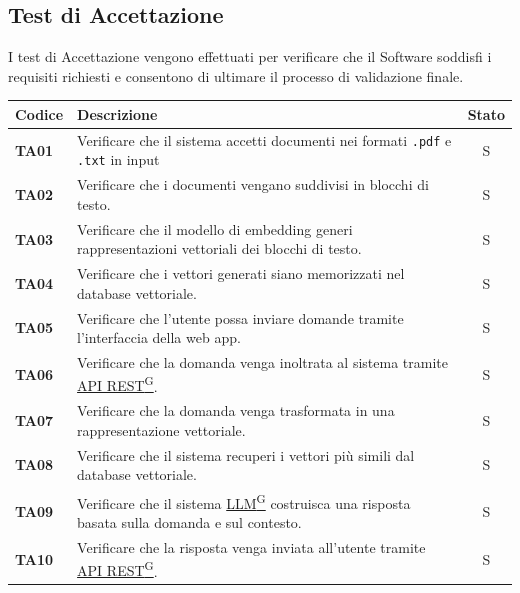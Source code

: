 \documentclass{article}
\begin{document}
\newpage
\subsection{Test di Accettazione} %
I test di Accettazione vengono effettuati per verificare che il Software soddisfi i requisiti richiesti e consentono di ultimare il processo di validazione finale.

\begin{longtable}{|>{\centering\arraybackslash}m{}|>{\raggedright\arraybackslash}m{}|c|}
    \hline
    \textbf{Codice} & \textbf{Descrizione} & \textbf{Stato} \\
    \hline
    \textbf{TA01} & Verificare che il sistema accetti documenti nei formati \texttt{.pdf} e \texttt{.txt} in input & S \\
    \hline
    \textbf{TA02} & Verificare che i documenti vengano suddivisi in blocchi di testo. & S \\
    \hline
    \textbf{TA03} & Verificare che il modello di embedding generi rappresentazioni vettoriali dei blocchi di testo. & S \\
    \hline
    \textbf{TA04} & Verificare che i vettori generati siano memorizzati nel database vettoriale. & S\\
    \hline
    \textbf{TA05} & Verificare che l’utente possa inviare domande tramite l’interfaccia della web app.& S\\
    \hline
    \textbf{TA06} & Verificare che la domanda venga inoltrata al sistema tramite \href{https://code7crusaders.github.io/docs/PB/documentazione_interna/glossario.html#api-rest-representational-state-transfer}{API REST\textsuperscript{G}}. & S\\
    \hline
    \textbf{TA07} & Verificare che la domanda venga trasformata in una rappresentazione vettoriale. & S\\
    \hline
    \textbf{TA08} & Verificare che il sistema recuperi i vettori più simili dal database vettoriale. & S\\
    \hline
    \textbf{TA09} & Verificare che il sistema \href{https://code7crusaders.github.io/docs/PB/documentazione_interna/glossario.html#llm-large-language-model}{LLM\textsuperscript{G}} costruisca una risposta basata sulla domanda e sul contesto. & S\\
    \hline
    \textbf{TA10} & Verificare che la risposta venga inviata all’utente tramite \href{https://code7crusaders.github.io/docs/PB/documentazione_interna/glossario.html#api-rest-representational-state-transfer}{API REST\textsuperscript{G}}.& S\\

\end{longtable}
\end{document}
